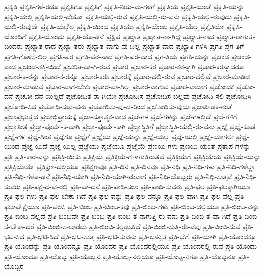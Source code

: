 {ಪ್ರಕೃತಿ
ಪ್ರಕೃತಿ-ಗಳೆ-ರಡೂ
ಪ್ರಕೃತಿಗೂ
ಪ್ರಕೃತಿಗೆ
ಪ್ರಕೃತಿ-ನಿಯ-ಮ-ಗಳಿಗೆ
ಪ್ರಕೃತಿಯ
ಪ್ರಕೃತಿ-ಯಂತೆ
ಪ್ರಕೃತಿ-ಯನ್ನು
ಪ್ರಕೃತಿ-ಯಲ್ಲಿ
ಪ್ರಕೃತಿ-ಯಲ್ಲಿ-ದೆಯೋ
ಪ್ರಕೃತಿ-ಯಲ್ಲಿ-ರುವ
ಪ್ರಕೃತಿ-ಯಲ್ಲಿ-ರು-ವನು
ಪ್ರಕೃತಿ-ಯಲ್ಲಿ-ರುವುದು
ಪ್ರಕೃತಿ-ಯಲ್ಲಿ-ರುವುದೇ
ಪ್ರಕೃತಿ-ಯಲ್ಲೆಲ್ಲ
ಪ್ರಕೃತಿ-ಯಿಂದ
ಪ್ರಕೃತಿಯು
ಪ್ರಕೃತಿ-ಯೆಂಬ
ಪ್ರಕೃತಿ-ಯೆಲ್ಲ
ಪ್ರಕೃತಿಯೇ
ಪ್ರಕೃತಿ-ಯೊಂದಿಗೆ
ಪ್ರಕೃತಿ-ಯೊಂದು
ಪ್ರಕೃತಿ-ಯೊ-ಡನೆ
ಪ್ರಕ್ಷಿಪ್ತ
ಪ್ರಖ್ಯಾತ
ಪ್ರಖ್ಯಾತ-ನಾ-ಗಿದ್ದ
ಪ್ರಖ್ಯಾತ-ನಾದ
ಪ್ರಖ್ಯಾತ-ರಾಗುತ್ತ-ಬಂದರು
ಪ್ರಖ್ಯಾತ-ರಾದ
ಪ್ರಖ್ಯಾ-ತರು
ಪ್ರಖ್ಯಾತ-ವಾಗು-ವು-ದಿಲ್ಲ
ಪ್ರಖ್ಯಾತ-ವಾದ
ಪ್ರಖ್ಯಾತಿ-ಗಳಿಸಿ
ಪ್ರಗತಿ
ಪ್ರಗ-ತಿಗೆ
ಪ್ರಗತಿ-ಗೊಳಿಸ-ಲಿಲ್ಲ
ಪ್ರಗತಿ-ಪರ
ಪ್ರಗತಿ-ಪರ-ನಾದ
ಪ್ರಗತಿ-ಪರ-ವಾದ
ಪ್ರಗ-ತಿಯ
ಪ್ರಗತಿ-ಯನ್ನು
ಪ್ರಚಂಡ
ಪ್ರಚಂಡ-ವಾದ
ಪ್ರಚಂಡ-ಶಕ್ತಿ-ಯಿದೆ
ಪ್ರಚಲಿತ-ವಾ-ಗಿ-ರುವ
ಪ್ರಚಾರ
ಪ್ರಚಾರ-ಕರ
ಪ್ರಚಾರ-ಕರನ್ನಾಗಿ
ಪ್ರಚಾರ-ಕರನ್ನಾದರೂ
ಪ್ರಚಾರ-ಕ-ರನ್ನು
ಪ್ರಚಾರ-ಕ-ರನ್ನೂ
ಪ್ರಚಾರ-ಕರು
ಪ್ರಚಾರಕ್ಕೆ
ಪ್ರಚಾರ-ದಲ್ಲಿ-ರುವ
ಪ್ರಚಾರ-ದಲ್ಲಿವೆ
ಪ್ರಚಾರ-ಮಾಡಿದ
ಪ್ರಚಾರ-ಮಾಡುವ
ಪ್ರಚಾರ-ವಾಗ-ಬೇಕು
ಪ್ರಚಾರ-ವಾ-ಗಿಲ್ಲ
ಪ್ರಚಾರ-ವಾಗುವ
ಪ್ರಚಾರ-ವಾದಾಗ
ಪ್ರಚೋದಕ
ಪ್ರಚೋ-ದನೆ
ಪ್ರಚೋ-ದನೆ-ಯಿಲ್ಲದೆ
ಪ್ರಚೋದಿತ-ರಾ-ಗಿಯೇ
ಪ್ರಚೋದಿಸ
ಪ್ರಚೋದಿಸ-ಬಲ್ಲವು
ಪ್ರಚೋದಿ-ಸಲಿ
ಪ್ರಚೋದಿಸಿ
ಪ್ರಚೋದಿ-ಸಿದ
ಪ್ರಚೋದಿ-ಸುವ-ವನು
ಪ್ರಚೋದಿಸು-ವು-ದ-ರಿಂದ
ಪ್ರಚೋದಿಸು-ವುದು
ಪ್ರಜಾಪೀಡಕ-ನಂತೆ
ಪ್ರಜಾಪ್ರಭುತ್ವದ
ಪ್ರಜಾಭಿಪ್ರಾಯಕ್ಕೆ
ಪ್ರಜಾ-ಸತ್ತಾತ್ಮಕ-ವಾದ
ಪ್ರಜೆ-ಗಳ
ಪ್ರಜೆ-ಗಳನ್ನು
ಪ್ರಜೆ-ಗಳಲ್ಲಿದೆ
ಪ್ರಜೆ-ಗಳಿಗೆ
ಪ್ರಜ್ಞಾತೀತ
ಪ್ರಜ್ಞಾ-ಪೂರ್ವ-ಕ-ವಾಗಿ
ಪ್ರಜ್ಞಾ-ಪೂರ್ವ-ಕಾಗಿ
ಪ್ರಜ್ಞಾಸ್ಥಿತಿಗೆ
ಪ್ರಜ್ಞಾಸ್ಥಿತಿ-ಯಲ್ಲಿ-ರು-ವನು
ಪ್ರಜ್ಞೆ
ಪ್ರಜ್ಞೆ-ಕೂಡ
ಪ್ರಜ್ಞೆ-ಗಳ
ಪ್ರಜ್ಞೆ-ಗಿಂತ
ಪ್ರಜ್ಞೆಗೂ
ಪ್ರಜ್ಞೆಗೆ
ಪ್ರಜ್ಞೆಯ
ಪ್ರಜ್ಞೆ-ಯನ್ನು
ಪ್ರಜ್ಞೆ-ಯಲ್ಲ
ಪ್ರಜ್ಞೆ-ಯಲ್ಲಿ
ಪ್ರಜ್ಞೆ-ಯಾಗಲೀ
ಪ್ರಜ್ಞೆ-ಯಿಂದ
ಪ್ರಜ್ಞೆ-ಯಿದೆ
ಪ್ರಜ್ಞೆ-ಯಿಲ್ಲ
ಪ್ರಜ್ಞೆಯು
ಪ್ರಜ್ಞೆಯೂ
ಪ್ರಜ್ಞೆಯೆ
ಪ್ರಣಯಿ-ಗಳು
ಪ್ರಣಯಿ-ಯಂತೆ
ಪ್ರತಾಪ-ಗಳನ್ನು
ಪ್ರತಿ
ಪ್ರತಿ-ಕಾರ-ವನ್ನು
ಪ್ರತಿಕ್ರಿ-ಯಿಸು
ಪ್ರತಿಕ್ರಿಯೆ
ಪ್ರತಿಕ್ರಿಯೆ-ಗಳಾಗುತ್ತಿರುತ್ತವೆ
ಪ್ರತಿಕ್ರಿಯೆಗೆ
ಪ್ರತಿಕ್ರಿಯೆಯ
ಪ್ರತಿಕ್ರಿಯೆ-ಯನ್ನು
ಪ್ರತಿಕ್ರಿಯೆಯೇ
ಪ್ರತಿಕ್ಷಣ-ದಲ್ಲಿಯೂ
ಪ್ರತಿಕ್ಷಣವೂ
ಪ್ರತಿ-ದಿನ
ಪ್ರತಿ-ದಿನವೂ
ಪ್ರತಿ-ನಿಧಿ
ಪ್ರತಿ-ನಿಧಿ-ಗಳು
ಪ್ರತಿ-ನಿಧಿ-ಗಳೆಲ್ಲಾ
ಪ್ರತಿ-ನಿಧಿ-ಗಳೊ-ಡನೆ
ಪ್ರತಿ-ನಿಧಿ-ಯಾಗಿ
ಪ್ರತಿ-ನಿಧಿ-ಯಾಗಿ-ರುವಾಗ
ಪ್ರತಿ-ನಿಧಿ-ಯೊಬ್ಬರು
ಪ್ರತಿ-ನಿಧಿ-ಸುತ್ತವೆ
ಪ್ರತಿ-ನಿಧಿ-ಸುವರು
ಪ್ರತಿ-ಪಕ್ಷ-ದ-ವ-ರಲ್ಲಿ
ಪ್ರತಿ-ಪಾ-ದನೆ
ಪ್ರತಿ-ಪಾದಿ-ಸಲು
ಪ್ರತಿ-ಪಾದಿ-ಸುವರು
ಪ್ರತಿ-ಫಲ
ಪ್ರತಿ-ಫಲಕ್ಕಾಗಿಯೂ
ಪ್ರತಿ-ಫಲ-ಗಳು
ಪ್ರತಿ-ಫಲ-ಬೇಕಾ-ಗಿದೆ
ಪ್ರತಿ-ಫಲ-ವನ್ನು
ಪ್ರತಿ-ಫಲ-ವನ್ನೂ
ಪ್ರತಿ-ಫಲ-ವಾಗಿ
ಪ್ರತಿ-ಫಲ-ವೆಲ್ಲ
ಪ್ರತಿ-ಫಲಾಪೇಕ್ಷೆಯೂ
ಪ್ರತಿ-ಫಲಿಸಿ
ಪ್ರತಿ-ಬಿಂಬ
ಪ್ರತಿ-ಬಿಂಬ-ಕವು
ಪ್ರತಿ-ಬಿಂಬ-ಗಳು
ಪ್ರತಿ-ಬಿಂಬ-ದಲ್ಲಿಯೂ
ಪ್ರತಿ-ಬಿಂಬ-ವನ್ನು
ಪ್ರತಿ-ಬಿಂಬ-ವಲ್ಲದೆ
ಪ್ರತಿ-ಬಿಂಬವೇ
ಪ್ರತಿ-ಬಿಂಬಿ
ಪ್ರತಿ-ಬಿಂಬಿ-ತ-ನಾಗುತ್ತಿ-ರು-ವನು
ಪ್ರತಿ-ಬಿಂಬಿ-ತ-ವಾ-ಗಿದೆ
ಪ್ರತಿ-ಬಿಂಬಿ-ಸ-ಬೇಕಾ-ದರೆ
ಪ್ರತಿ-ಬಿಂಬಿ-ಸ-ಲಾರದು
ಪ್ರತಿ-ಬಿಂಬಿ-ಸಲ್ಪಡುತ್ತಿದೆ
ಪ್ರತಿ-ಬಿಂಬಿ-ಸುತ್ತಿ-ರು-ವೆವು
ಪ್ರತಿ-ಬಿಂಬಿ-ಸುವ
ಪ್ರತಿ-ಭಟಿ-ಸಿದ
ಪ್ರತಿ-ಭಟಿ-ಸಿದೆ
ಪ್ರತಿ-ಭಟಿ-ಸುತ್ತ
ಪ್ರತಿ-ಭಟಿ-ಸುವನು
ಪ್ರತಿ-ಭಾನ್ವಿತ
ಪ್ರತಿ-ಭೆಗೆ
ಪ್ರತಿ-ಯಾಗಿ
ಪ್ರತಿ-ಯೊಂದಕ್ಕೂ
ಪ್ರತಿ-ಯೊಂದನ್ನು
ಪ್ರತಿ-ಯೊಂದನ್ನೂ
ಪ್ರತಿ-ಯೊಂದರ
ಪ್ರತಿ-ಯೊಂದರಲ್ಲಿಯೂ
ಪ್ರತಿ-ಯೊಂದರಲ್ಲಿ-ರುವ
ಪ್ರತಿ-ಯೊಂದು
ಪ್ರತಿ-ಯೊಂದೂ
ಪ್ರತಿ-ಯೊಬ್ಬ
ಪ್ರತಿ-ಯೊಬ್ಬನ
ಪ್ರತಿ-ಯೊಬ್ಬ-ನಲ್ಲಿಯೂ
ಪ್ರತಿ-ಯೊಬ್ಬ-ನಿಗೂ
ಪ್ರತಿ-ಯೊಬ್ಬನೂ
ಪ್ರತಿ-ಯೊಬ್ಬರ
}
